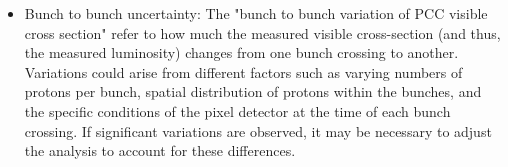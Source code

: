 \begin{itemize}
\begin{itemize}

\end{itemize}


\item Bunch to bunch uncertainty: The "bunch to bunch variation of PCC visible cross section" refer to how much the measured visible cross-section (and thus, the measured luminosity) changes from one bunch crossing to another. Variations could arise from different factors such as varying numbers of protons per bunch, spatial distribution of protons within the bunches, and the specific conditions of the pixel detector at the time of each bunch crossing. %
If significant variations are observed, it may be necessary to adjust the analysis to account for these differences. 



\end{itemize}
